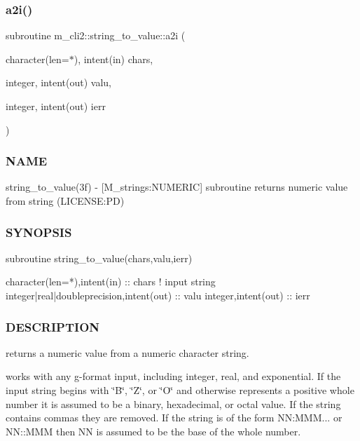 \mbox{\label{interfacem__cli2_1_1string__to__value_af221de32e1c7dd6915ea45dc3a0147ed}} 
\subsubsection{\texorpdfstring{a2i()}{a2i()}}
{\footnotesize\ttfamily subroutine m\+\_\+cli2\+::string\+\_\+to\+\_\+value\+::a2i (\begin{DoxyParamCaption}\item[{character(len=$\ast$), intent(in)}]{chars,  }\item[{integer, intent(out)}]{valu,  }\item[{integer, intent(out)}]{ierr }\end{DoxyParamCaption})\hspace{0.3cm}{\ttfamily [private]}}



\subsubsection*{N\+A\+ME}

string\+\_\+to\+\_\+value(3f) -\/ \mbox{[}M\+\_\+strings\+:N\+U\+M\+E\+R\+IC\mbox{]} subroutine returns numeric value from string (L\+I\+C\+E\+N\+SE\+:PD) 

\subsubsection*{S\+Y\+N\+O\+P\+S\+IS}

\begin{DoxyVerb}subroutine string_to_value(chars,valu,ierr)

 character(len=*),intent(in)              :: chars   ! input string
 integer|real|doubleprecision,intent(out) :: valu
 integer,intent(out)                      :: ierr
\end{DoxyVerb}
 \subsubsection*{D\+E\+S\+C\+R\+I\+P\+T\+I\+ON}

returns a numeric value from a numeric character string.

works with any g-\/format input, including integer, real, and exponential. If the input string begins with \char`\"{}\+B\char`\"{}, \char`\"{}\+Z\char`\"{}, or \char`\"{}\+O\char`\"{} and otherwise represents a positive whole number it is assumed to be a binary, hexadecimal, or octal value. If the string contains commas they are removed. If the string is of the form NN\+:M\+MM... or N\+N\+::\+M\+MM then NN is assumed to be the base of the whole number.

